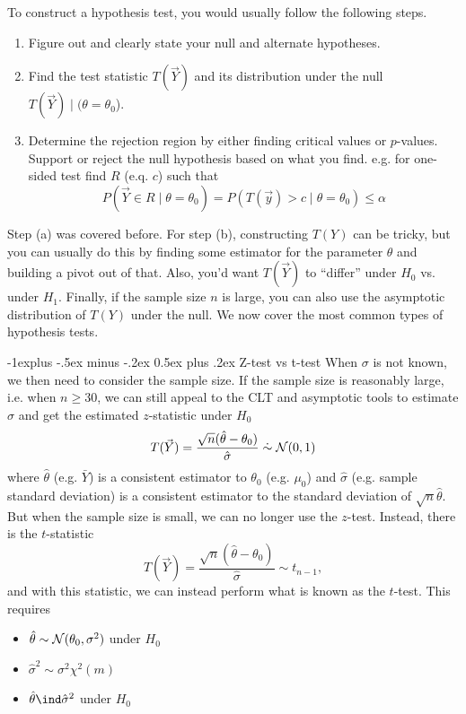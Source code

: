 \documentclass[10pt,landscape]{article}
\makeatletter
\renewcommand{\subsection}{\@startsection{subsection}{2}{0mm}%
                                {-1explus -.5ex minus -.2ex}%
                                {0.5ex plus .2ex}%
                                {\normalfont\normalsize\bfseries}}
\makeatother
\begin{document}
\begin{multicols*}{3}
To construct a hypothesis test, you would usually follow the following steps.
\begin{enumerate}
    \item Figure out and clearly state your null and alternate hypotheses.
    \item  Find the test statistic $T(\vec{Y})$ and its distribution under the null $T(\vec{Y})\mid (\theta = \theta_0$).
    \item Determine the rejection region by either finding critical values or $p$-values. Support or reject the null hypothesis based on what you find. e.g. for one-sided test find $R$ (e.q. $c$) such that
    $$
    P(\vec{Y}\in R\mid\theta=\theta_0)=P(T(\vec{y})>c\mid\theta=\theta_0)\leq \alpha
    $$
\end{enumerate}

Step (a) was covered before. For step (b), constructing $T(Y)$ can be tricky, but you can usually do this by finding some estimator for the parameter $\theta$ and building a pivot out of that. Also, you'd want $T(\vec Y)$ to ``differ'' under $H_0$ vs. under $H_1$. Finally, if the sample size $n$ is large, you can also use the asymptotic distribution of $T(Y)$ under the null. We now cover the most common types of hypothesis tests.

\subsection{Z-test vs t-test}
When $\sigma$ is not known, we then need to consider the sample size. If the sample size is reasonably large, i.e. when $n\geq 30$, we can still appeal to the CLT and asymptotic tools to estimate $\sigma$ and get the estimated $z$-statistic under $H_0$ $$T(\vec Y) =\frac{\sqrt{n}(\hat{\theta}-\theta_0)}{\hat\sigma}\mathrel{\dot\sim} \mathcal{N}(0,1)$$
where $\hat\theta$ (e.g. $\bar Y$) is a consistent estimator to $\theta_0$ (e.g. $\mu_0$) and $\hat \sigma$ (e.g. sample standard deviation) is a consistent estimator to the standard deviation of $\sqrt{n}\hat \theta$. But when the sample size is small, we can no longer use the $z$-test. Instead, there is the $t$-statistic $$T(\vec Y)=\frac{\sqrt{n}(\hat\theta-\theta_0)}{\hat\sigma}\sim t_{n-1},$$ and with this statistic, we can instead perform what is known as the $t$-test. This requires
\begin{itemize}
    \item $\hat\theta\sim\mathcal{N}(\theta_0,\sigma^2)$ under $H_0$
    \item $\hat\sigma^2\sim \sigma^2\chi^2(m)$
    \item $\hat\theta\ind\hat\sigma^2$ under $H_0$
\end{itemize}


\end{multicols*}
\end{document}
